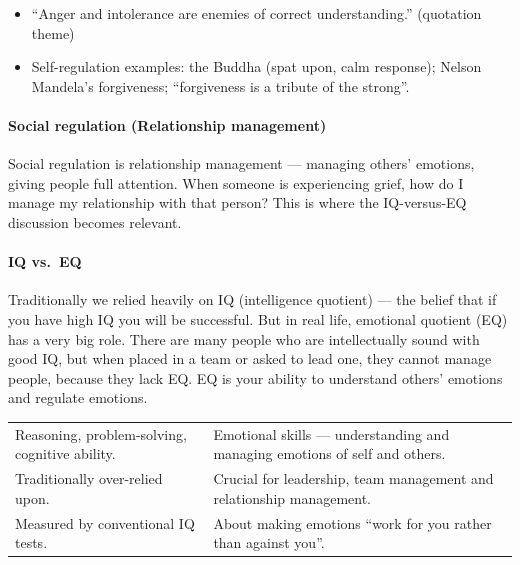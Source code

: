\begin{PYQLink}
\begin{itemize}
\item ``Anger and intolerance are enemies of correct understanding.'' (quotation theme)
\item Self-regulation examples: the Buddha (spat upon, calm response); Nelson Mandela's forgiveness; ``forgiveness is a tribute of the strong''.
\end{itemize}
\end{PYQLink}

\paragraph{Social regulation (Relationship management)} Social regulation is relationship management --- managing others' emotions, giving people full attention. When someone is experiencing grief, how do I manage my relationship with that person? This is where the IQ-versus-EQ discussion becomes relevant.

\paragraph{IQ vs.\ EQ} Traditionally we relied heavily on IQ (intelligence quotient) --- the belief that if you have high IQ you will be successful. But in real life, emotional quotient (EQ) has a very big role. There are many people who are intellectually sound with good IQ, but when placed in a team or asked to lead one, they cannot manage people, because they lack EQ. EQ is your ability to understand others' emotions and regulate emotions.

\begin{center}
\begin{tabularx}{\textwidth}{Y Y}
 &  \\
\toprule
Reasoning, problem-solving, cognitive ability. & Emotional skills --- understanding and managing emotions of self and others. \\
Traditionally over-relied upon. & Crucial for leadership, team management and relationship management. \\
Measured by conventional IQ tests. & About making emotions ``work for you rather than against you''. \\
\bottomrule
\end{tabularx}
\end{center}

